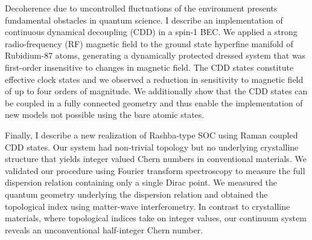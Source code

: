 Decoherence due to uncontrolled fluctuations of the environment presents fundamental obstacles in quantum science. I describe an implementation of continuous dynamical decoupling (CDD) in a spin-1 BEC. We applied a strong radio-frequency (RF) magnetic field to the ground state hyperfine manifold of Rubidium-87 atoms, generating a dynamically protected dressed system that was first-order insensitive to changes in magnetic field. The CDD states constitute effective clock states and we observed a reduction in sensitivity to magnetic field of up to four orders of magnitude. We additionally show that the CDD states can be coupled in a fully connected geometry and thus enable the implementation of new models not possible using the bare atomic states. 

Finally, I describe a new realization of Rashba-type SOC using Raman coupled CDD states. Our system had non-trivial topology but no underlying crystalline structure that yields integer valued Chern numbers in conventional materials. We validated our procedure using Fourier transform spectroscopy to measure the full dispersion relation containing only a single Dirac point. We measured the quantum geometry underlying the dispersion relation and obtained the topological index using matter-wave interferometry. In contrast to crystalline materials, where topological indices take on integer values, our continuum system reveals an unconventional half-integer Chern number.
